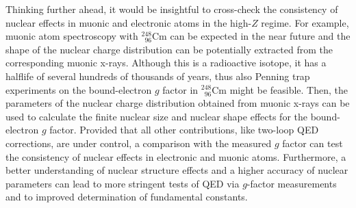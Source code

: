 Thinking further ahead, it would be insightful to cross-check the consistency of nuclear effects in muonic and electronic atoms in the high-$Z$ regime. 
For example, muonic atom spectroscopy with $_{\phantom{1}96}^{248}$Cm can be expected in the near future and the shape of the nuclear charge distribution can be potentially extracted from the corresponding muonic x-rays. Although this is a radioactive isotope, it has a halflife of several hundreds of thousands of years, thus also Penning trap experiments on the bound-electron $g$ factor in $_{\phantom{1}96}^{248}$Cm might be feasible. Then, the parameters of the nuclear charge distribution obtained from muonic x-rays can be used to calculate the finite nuclear size and nuclear shape effects for the bound-electron $g$ factor. Provided that all other contributions, like two-loop QED corrections, are under control, a comparison with the measured $g$ factor can test the consistency of nuclear effects in electronic and muonic atoms. 
Furthermore, a better understanding of nuclear structure effects and a higher accuracy of nuclear parameters can lead to more stringent tests of QED via $g$-factor measurements and to improved determination of fundamental constants.

%
 






